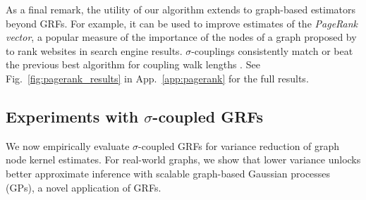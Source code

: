  As a final remark, the utility of our algorithm extends to graph-based estimators beyond GRFs. 
For example, it can be used to improve estimates of the \emph{PageRank vector}, a popular measure of the importance of the nodes of a graph proposed by \cite{page1998pagerank} to rank websites in search engine results.
$\sigma$-couplings consistently match or beat the previous best algorithm for coupling walk lengths \citep{reid2023quasi}.
See Fig.~\ref{fig:pagerank_results} in App.~\ref{app:pagerank} for the full results.

\vspace{-3mm}\subsection{Experiments with $\sigma$-coupled GRFs} \label{sec:graph_gp_experiments} \vspace{-2mm}
We now empirically evaluate $\sigma$-coupled GRFs for variance reduction of graph node kernel estimates. 
For real-world graphs, we show that lower variance unlocks better approximate inference with scalable graph-based Gaussian processes (GPs), a novel application of GRFs. 


